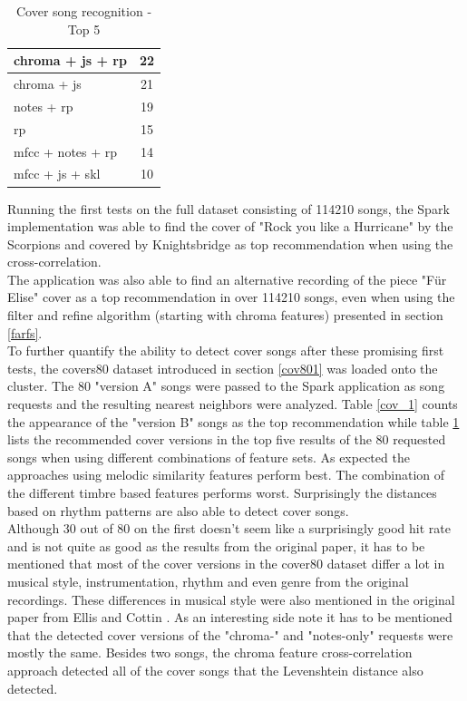 \begin{table}[H]
\begin{minipage}{0.5\textwidth}
\begin{center}
\begin{tabular}{|l||c|}
				\hline
				chroma + js + rp & 22\\
				\hline
				chroma + js & 21\\
				\hline
				notes + rp & 19\\
				\hline
				rp & 15\\
				\hline
				mfcc + notes + rp & 14\\
				\hline
				mfcc + js + skl & 10\\
				\hline
			\end{tabular}
			\label{cov_2}
		\end{center}
		\caption{Cover song recognition - Top 5}
	\end{minipage}
\end{table}

\noindent Running the first tests on the full dataset consisting of 114210 songs, the Spark implementation was able to find the cover of "Rock you like a Hurricane" by the Scorpions and covered by Knightsbridge as top recommendation when using the cross-correlation.\\
\noindent The application was also able to find an alternative recording of the piece "Für Elise" cover as a top recommendation in over 114210 songs, even when using the filter and refine algorithm (starting with chroma features) presented in section \ref{farfs}.\\
\noindent To further quantify the ability to detect cover songs after these promising first tests, the covers80 dataset introduced in section \ref{cov801} was loaded onto the cluster. The 80 "version A" songs were passed to the Spark application as song requests and the resulting nearest neighbors were analyzed. Table \ref{cov_1} counts the appearance of the "version B" songs as the top recommendation while table \ref{cov_2} lists the recommended cover versions in the top five results of the 80 requested songs when using different combinations of feature sets. As expected the approaches using melodic similarity features perform best. The combination of the different timbre based features performs worst. Surprisingly the distances based on rhythm patterns are also able to detect cover songs.\\
\noindent Although 30 out of 80 on the first doesn't seem like a surprisingly good hit rate and is not quite as good as the results from the original paper, it has to be mentioned that most of the cover versions in the cover80 dataset differ a lot in musical style, instrumentation, rhythm and even genre from the original recordings. These differences in musical style were also mentioned in the original paper from Ellis and Cottin \cite[p. 3]{cover802}.
\noindent As an interesting side note it has to be mentioned that the detected cover versions of the "chroma-" and "notes-only" requests were mostly the same. Besides two songs, the chroma feature cross-correlation approach detected all of the cover songs that the Levenshtein distance also detected. 

